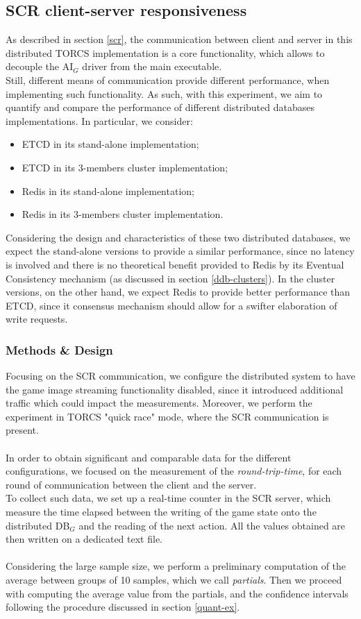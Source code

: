 \subsection{SCR client-server responsiveness}\label{scr-responsiveness-desc}
As described in section \ref{scr}, the communication between client and server in this distributed TORCS implementation is a core functionality, which allows to decouple the AI$_G$ driver from the main executable. \\
Still, different means of communication provide different performance, when implementing such functionality. As such, with this experiment, we aim to quantify and compare the performance of different distributed databases implementations. In particular, we consider:
\begin{itemize}
	\item ETCD in its stand-alone implementation;
	\item ETCD in its 3-members cluster implementation;
	\item Redis in its stand-alone implementation;
	\item Redis in its 3-members cluster implementation.
\end{itemize}
Considering the design and characteristics of these two distributed databases, we expect the stand-alone versions to provide a similar performance, since no latency is involved and there is no theoretical benefit provided to Redis by its Eventual Consistency mechanism (as discussed in section \ref{ddb-clusters}). In the cluster versions, on the other hand, we expect Redis to provide better performance than ETCD, since it consensus mechanism should allow for a swifter elaboration of write requests.

\subsubsection{Methods \& Design}
Focusing on the SCR communication, we configure the distributed system to have the game image streaming functionality disabled, since it introduced additional traffic which could impact the measurements. Moreover, we perform the experiment in TORCS "quick race" mode, where the SCR communication is present. \\ \\
In order to obtain significant and comparable data for the different configurations, we focused on the measurement of the \textit{round-trip-time}, for each round of communication between the client and the server. \\
To collect such data, we set up a real-time counter in the SCR server, which measure the time elapsed between the writing of the game state onto the distributed DB$_G$ and the reading of the next action. All the values obtained are then written on a dedicated text file. \\ \\
Considering the large sample size, we perform a preliminary computation of the average between groups of 10 samples, which we call \textit{partials}. Then we proceed with computing the average value from the partials, and the confidence intervals following the procedure discussed in section \ref{quant-ex}.

